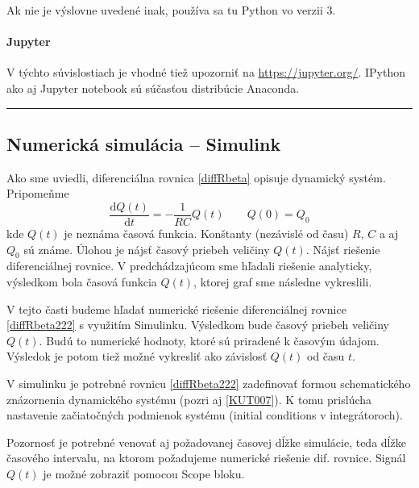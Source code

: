 \documentclass[a4paper, 10pt, ]{article}
\begin{document}
\medskip

\noindent
Ak nie je výslovne uvedené inak, používa sa tu Python vo verzii 3.

\paragraph{Jupyter}
V týchto súvislostiach je vhodné tiež upozorniť na \url{https://jupyter.org/}. IPython ako aj Jupyter notebook sú súčasťou distribúcie Anaconda.

\medskip

\noindent
\hrule







\subsection{Numerická simulácia -- Simulink}



Ako sme uviedli, diferenciálna rovnica \eqref{diffRbeta} opisuje dynamický systém. Pripomeňme
\begin{equation} \label{diffRbeta222}
    \frac{\text{d}Q(t)}{\text{d}t} = - \frac{1}{RC} Q(t) \qquad Q(0) = Q_0
\end{equation}
kde $Q(t)$ je neznáma časová funkcia. Konštanty (nezávislé od času) $R$, $C$ a aj $Q_0$ sú známe. Úlohou je nájsť časový priebeh veličiny $Q(t)$. Nájsť riešenie diferenciálnej rovnice. V predchádzajúcom sme hľadali riešenie analyticky, výsledkom bola časová funkcia $Q(t)$, ktorej graf sme následne vykreslili.

V tejto časti budeme hľadať numerické riešenie diferenciálnej rovnice \eqref{diffRbeta222} s využitím Simulinku. Výsledkom bude časový priebeh veličiny $Q(t)$. Budú to numerické hodnoty, ktoré sú priradené k časovým údajom. Výsledok je potom tiež možné vykresliť ako závislosť $Q(t)$ od času $t$.

V simulinku je potrebné rovnicu \eqref{diffRbeta222} zadefinovať formou schematického znázornenia dynamického systému (pozri aj [\href{https://github.com/PracovnyBod/KUT/tree/main/KUT_items/KUT007/TeX}{\textsf{KUT007}}]). K tomu prislúcha nastavenie začiatočných podmienok systému (initial conditions v integrátoroch).

Pozornosť je potrebné venovať aj požadovanej časovej dĺžke simulácie, teda dĺžke časového intervalu, na ktorom požadujeme numerické riešenie dif. rovnice. Signál $Q(t)$ je možné zobraziť pomocou Scope bloku.
\end{document}
